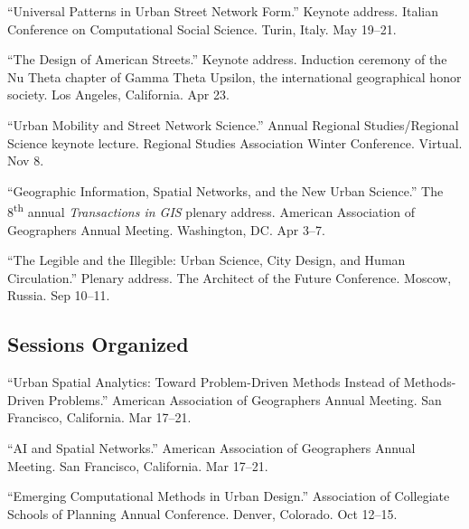 \documentclass[11pt,a4paper]{report} %
\begin{document}
\begin{tablist}

\item[2026] \tab{}\enquote{Universal Patterns in Urban Street Network Form.} Keynote address. Italian Conference on Computational Social Science. Turin, Italy. May 19--21.

\item[2024] \tab{}\enquote{The Design of American Streets.} Keynote address. Induction ceremony of the Nu Theta chapter of Gamma Theta Upsilon, the international geographical honor society. Los Angeles, California. Apr 23.

\item[2021] \tab{}\enquote{Urban Mobility and Street Network Science.} Annual Regional Studies/Regional Science keynote lecture. Regional Studies Association Winter Conference. Virtual. Nov 8.

\item[2019] \tab{}\enquote{Geographic Information, Spatial Networks, and the New Urban Science.} The 8\textsuperscript{th} annual \textit{Transactions in GIS} plenary address. American Association of Geographers Annual Meeting. Washington, DC\@. Apr 3--7.

\item[2018] \tab{}\enquote{The Legible and the Illegible: Urban Science, City Design, and Human Circulation.} Plenary address. The Architect of the Future Conference. Moscow, Russia. Sep 10--11.

\end{tablist}

\subsection*{Sessions Organized}

\begin{tablist}

\item[2026] \tab{}\enquote{Urban Spatial Analytics: Toward Problem-Driven Methods Instead of Methods-Driven Problems.} American Association of Geographers Annual Meeting. San Francisco, California. Mar 17--21.

\item[2026] \tab{}\enquote{AI and Spatial Networks.} American Association of Geographers Annual Meeting. San Francisco, California. Mar 17--21.

\item[2017] \tab{}\enquote{Emerging Computational Methods in Urban Design.} Association of Collegiate Schools of Planning Annual Conference. Denver, Colorado. Oct 12--15.

\end{tablist}
\end{document}
